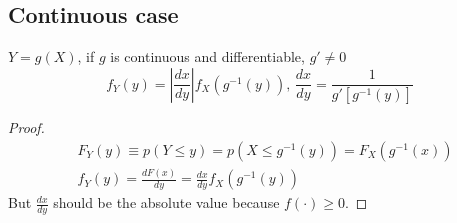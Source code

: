 \subsection{Continuous case} $Y = g(X)$, if $g$ is continuous and differentiable, $g'\neq 0$ \[
    f_Y(y) = \left| \frac{dx}{dy}\right| f_X(g^{-1}(y)) , \, \frac{dx}{dy} = \frac{1}{g'[g^{-1}(y)]}
\]

\begin{proof}
    \begin{align*}
         & F_Y(y) \equiv p(Y \leq y) = p(X \leq g^{-1}(y)) = F_X(g^{-1}(x)) \\
         & f_Y(y) = \frac{d F(x)}{dy} = \frac{dx}{dy} f_X(g^{-1}(y))
    \end{align*}
    But $\frac{dx}{dy}$ should be the absolute value because $f(\cdot) \geq 0$.
\end{proof}
